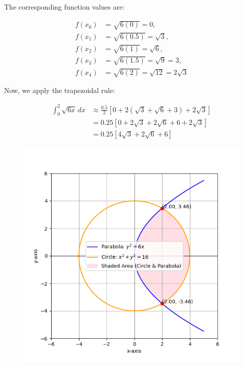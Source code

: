 \documentclass[journal]{IEEEtran}
\begin{document}
The corresponding function values are:

\begin{align*}
f(x_0) &= \sqrt{6(0)} = 0, \\
f(x_1) &= \sqrt{6(0.5)} = \sqrt{3}, \\
f(x_2) &= \sqrt{6(1)} = \sqrt{6}, \\
f(x_3) &= \sqrt{6(1.5)} = \sqrt{9} = 3, \\
f(x_4) &= \sqrt{6(2)} = \sqrt{12} = 2\sqrt{3}
\end{align*}

Now, we apply the trapezoidal rule:

\begin{align*}
\int_0^2 \sqrt{6x} \, dx &\approx \frac{0.5}{2} \left[ 0 + 2 \left( \sqrt{3} + \sqrt{6} + 3 \right) + 2\sqrt{3} \right] \\
&= 0.25 \left[ 0 + 2\sqrt{3} + 2\sqrt{6} + 6 + 2\sqrt{3} \right] \\
&= 0.25 \left[ 4\sqrt{3} + 2\sqrt{6} + 6 \right]
\end{align*}
\begin{figure}[h]
    \centering
    \includegraphics[width=\textwidth]{figs/fig.png}
\end{figure}
\end{document}
